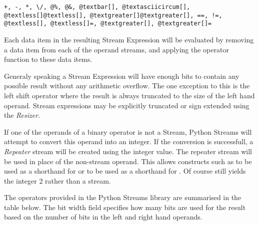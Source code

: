 \documentclass[letterpaper,10pt,english]{manual}
\begin{document}
\begin{Verbatim}[commandchars=@\[\]]
+, -, *, \/, @%, @&, @textbar[], @textasciicircum[], @textless[]@textless[], @textgreater[]@textgreater[], ==, !=, @textless[], @textless[]=, @textgreater[], @textgreater[]=
\end{Verbatim}

Each data item in the resulting Stream Expression will be evaluated by removing
a data item from each of the operand streams, and applying the operator
function to these data items.

Generaly speaking a Stream Expression will have enough bits to contain any
possible result without any arithmetic overflow. The one exception to this is
the left shift operator where the result is always truncated to the size of the
left hand operand. Stream expressions may be explicitly truncated or sign
extended using the \emph{Resizer}.

If one of the operands of a binary operator is not a Stream, Python Streams
will attempt to convert this operand into an integer. If the conversion is
successfull, a \emph{Repeater} stream will be created using the integer value. The
repeater stream will be used in place of the non-stream operand. This allows
constructs such as  to be used as a shorthand for  or  to be used as
a shorthand for .  Of course 
still yields the integer 2 rather than a stream.

The operators provided in the Python Streams library are summarised in the
table below. The bit width field specifies how many bits are used for the
result based on the number of bits in the left and right hand operands.
\end{document}
